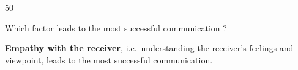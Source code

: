 \begin{question}{50}
{Which factor leads to the most successful communication ?\par}
\begin{explain}
\textbf{Empathy with the receiver}, i.e.\ understanding the receiver's feelings and viewpoint, leads to the most successful communication.
\end{explain}
\end{question}
